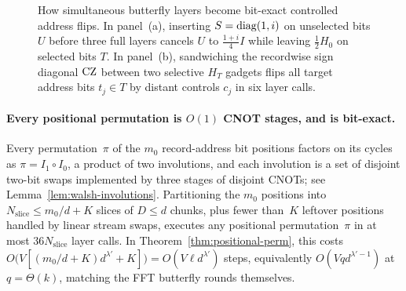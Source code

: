 \begin{figure}[!ht]
\caption{How simultaneous butterfly layers become bit-exact controlled address flips. In panel~(a), inserting $S=\operatorname{diag}(1,i)$ on unselected bits $U$ before three full layers cancels $U$ to $\frac{1+i}{4}I$ while leaving $\frac12 H_0$ on selected bits $T$. In panel~(b), sandwiching the recordwise sign diagonal $\mathrm{CZ}$ between two selective $H_T$ gadgets flips all target address bits $t_j\in T$ by distant controls $c_j$ in six layer calls.}
\label{fig:walsh-gadget}
\end{figure}

\paragraph{Every positional permutation is $O(1)$ CNOT stages, and is bit-exact.}
Every permutation~$\pi$ of the $m_0$ record-address bit positions factors on its cycles as $\pi = I_1\circ I_0$, a product of two involutions, and each involution is a set of disjoint two-bit swaps implemented by three stages of disjoint CNOTs; see Lemma~\ref{lem:walsh-involutions}. Partitioning the $m_0$ positions into $N_{\mathrm{slice}}\le m_0/d + K$ slices of $D\le d$ chunks, plus fewer than~$K$ leftover positions handled by linear stream swaps, executes any positional permutation~$\pi$ in at most $36 N_{\mathrm{slice}}$ layer calls. In Theorem~\ref{thm:positional-perm}, this costs $O\bigl(V[(m_0/d+K)d^{\lambda'}+K]\bigr)=O(V\ell d^{\lambda'})$ steps, equivalently $O(V q d^{\lambda'-1})$ at $q=\Theta(k)$, matching the FFT butterfly rounds themselves.

